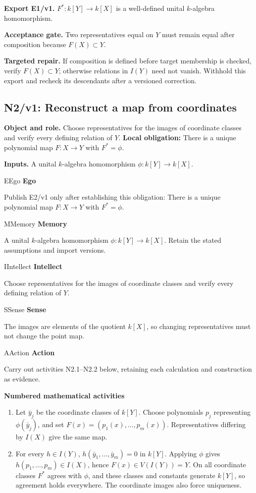 \documentclass[preprint,12pt,aps,pra,showkeys,amsmath,amssymb,superscriptaddress,floatfix]{revtex4-2}
\theoremstyle{definition}
\theoremstyle{remark}
\newcommand{\mmfaculty}[3]{%
 \begin{mmfacultybox}{#1}{#2}
 {\sffamily\bfseries\color{MMBlue}#2}\par\smallskip #3
 \end{mmfacultybox}}
\newcommand{\field}[2]{\par\smallskip\noindent\textbf{#1.} #2\par}
\begin{document}
\field{Export E1/v1}{\(F^*:k[Y]\to k[X]\) is a well-defined unital \(k\)-algebra
homomorphism.}

\field{Acceptance gate}{Two representatives equal on \(Y\) must remain equal after composition
because \(F(X)\subset Y\).}

\field{Targeted repair}{If composition is defined before target membership is checked, verify
\(F(X)\subset Y\); otherwise relations in \(I(Y)\) need not vanish.
Withhold this export and recheck its descendants after a versioned
correction.}

\clearpage

\subsection{N2/v1: Reconstruct a map from coordinates}

\field{Object and role}{Choose representatives for the images of coordinate classes and verify
every defining relation of \(Y\). \textbf{Local obligation:} There is a
unique polynomial map \(F:X\to Y\) with \(F^*=\phi\).}

\field{Inputs}{A unital \(k\)-algebra homomorphism \(\phi:k[Y]\to k[X]\).}

\mmfaculty{E}{Ego}{Publish E2/v1 only after establishing this obligation: There is a unique
polynomial map \(F:X\to Y\) with \(F^*=\phi\).}

\mmfaculty{M}{Memory}{A unital \(k\)-algebra homomorphism \(\phi:k[Y]\to k[X]\). Retain the
stated assumptions and import versions.}

\mmfaculty{I}{Intellect}{Choose representatives for the images of coordinate classes and verify
every defining relation of \(Y\).}

\mmfaculty{S}{Sense}{The images are elements of the quotient \(k[X]\), so changing
representatives must not change the point map.}

\mmfaculty{A}{Action}{Carry out activities N2.1--N2.2 below, retaining each calculation and
construction as evidence.}

\smallskip\noindent\textbf{Numbered mathematical activities}

\begin{enumerate}[label=N2.\arabic*,leftmargin=3.4em]

\item Let \(\bar y_j\) be the coordinate classes of \(k[Y]\). Choose
polynomials \(p_j\) representing \(\phi(\bar y_j)\), and set
\(F(x)=(p_1(x),\ldots,p_m(x))\). Representatives differing by \(I(X)\)
give the same map.

\item For every \(h\in I(Y)\), \(h(\bar y_1,\ldots,\bar y_m)=0\) in \(k[Y]\).
Applying \(\phi\) gives \(h(p_1,\ldots,p_m)\in I(X)\), hence
\(F(x)\in V(I(Y))=Y\). On all coordinate classes \(F^*\) agrees with
\(\phi\), and these classes and constants generate \(k[Y]\), so
agreement holds everywhere. The coordinate images also force uniqueness.

\end{enumerate}
\end{document}
